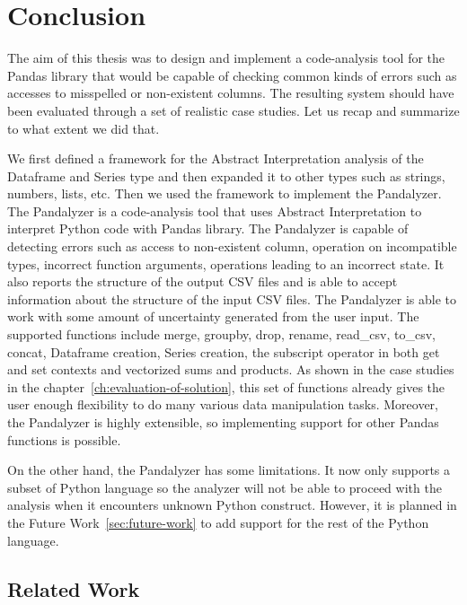 \chapter*{Conclusion}

The aim of this thesis was to design and implement a code-analysis tool for the Pandas library that would be capable of
checking common kinds of errors such as accesses to misspelled or non-existent columns.
The resulting system should have been evaluated through a set of realistic case studies.
Let us recap and summarize to what extent we did that.

We first defined a framework for the Abstract Interpretation analysis of the Dataframe and Series type and then expanded it
to other types such as strings, numbers, lists, etc.
Then we used the framework to implement the Pandalyzer.
The Pandalyzer is a code-analysis tool that uses Abstract Interpretation to interpret Python code with Pandas
library.
The Pandalyzer is capable of detecting errors such as access to non-existent column, operation on incompatible types,
incorrect function arguments, operations leading to an incorrect state.
It also reports the structure of the output CSV files and is able to accept information about the structure of the input CSV files.
The Pandalyzer is able to work with some amount of uncertainty generated from the user input.
The supported functions include merge, groupby, drop, rename, read\_csv, to\_csv, concat, Dataframe creation,
Series creation, the subscript operator in both get and set contexts and vectorized sums and products.
As shown in the case studies in the chapter~\ref{ch:evaluation-of-solution}, this set of functions already gives
the user enough flexibility to do many various data manipulation tasks.
Moreover, the Pandalyzer is highly extensible, so implementing support for other Pandas functions is possible.

On the other hand, the Pandalyzer has some limitations.
It now only supports a subset of Python language so the analyzer will not be able to proceed with the analysis when
it encounters unknown Python construct.
However, it is planned in the Future Work~\ref{sec:future-work} to add support for the rest of the Python language.

\section*{Related Work}

